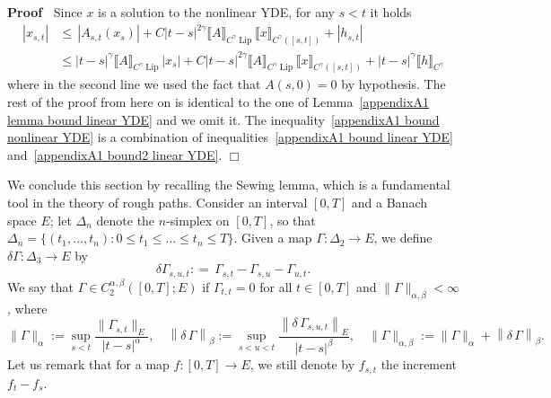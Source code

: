\documentclass[10pt]{article}
\newcommand{\assign}{:=}
\newcommand{\tmop}[1]{\ensuremath{\operatorname{#1}}}
\newenvironment{proof}{\noindent\textbf{Proof\ }}{\hspace*{\fill}$\Box$\medskip}
\begin{document}
\begin{proof}
  Since $x$ is a solution to the nonlinear YDE, for any $s < t$ it holds
%  
  \begin{align*}
    | x_{s, t} | & \leqslant \, | A_{s, t} (x_s) | + C | t - s |^{2 \gamma}
    \llbracket A \rrbracket_{C^{\gamma} \tmop{Lip}} \llbracket x
    \rrbracket_{C^{\gamma} ([s, t])} + | h_{s, t} |\\
    & \leqslant | t - s |^{\gamma} \llbracket A \rrbracket_{C^{\gamma}
    \tmop{Lip}} | x_s | + C | t - s |^{2 \gamma} \llbracket A
    \rrbracket_{C^{\gamma} \tmop{Lip}} \llbracket x \rrbracket_{C^{\gamma}
    ([s, t])} + | t - s |^{\gamma} \llbracket h \rrbracket_{C^{\gamma}}
  \end{align*}
%  
  where in the second line we used the fact that $A (s, 0) = 0$ by hypothesis.
  The rest of the proof from here on is identical to the one of
  Lemma~\ref{appendixA1 lemma bound linear YDE} and we omit it. The
  inequality~{\eqref{appendixA1 bound nonlinear YDE}} is a combination of
  inequalities~{\eqref{appendixA1 bound linear YDE}} and~{\eqref{appendixA1
  bound2 linear YDE}}.
\end{proof}

We conclude this section by recalling the Sewing lemma, which is a fundamental
tool in the theory of rough paths. Consider an interval $[0, T]$ and a Banach
space $E$; let $\Delta_n$ denote the $n$\mbox{-}simplex on $[0, T]$, so that
$\Delta_n = \{ (t_1, \ldots, t_n) : 0 \leqslant t_1 \leqslant \ldots \leqslant
t_n \leqslant T \}$. Given a map $\Gamma : \Delta_2 \rightarrow E$, we define
$\delta \Gamma : \Delta_3 \rightarrow E$ by
\[ \delta \Gamma_{s, u, t} : = \, \Gamma_{s, t} - \Gamma_{s, u} - \Gamma_{u,
   t} . \]
We say that $\Gamma \in C^{\alpha, \beta}_2 ([0, T] ; E)$ if $\Gamma_{t, t} =
0$ for all $t \in [0, T]$ and $\| \Gamma \|_{\alpha, \beta} < \infty$, where
\[ \| \Gamma \|_{\alpha} \assign \sup_{s < t} \frac{\| \Gamma_{s, t} \|_E}{| t
   - s |^{\alpha}}, \quad \left\| \delta \, \Gamma \right\|_{\beta} \assign
   \sup_{s < u < t} \frac{\left\| \delta \, \Gamma_{s, u, t} \right\|_E}{| t -
   s |^{\beta}}, \quad \| \Gamma \|_{\alpha, \beta} \assign \| \Gamma
   \|_{\alpha} + \left\| \delta \, \Gamma \right\|_{\beta} . \]
Let us remark that for a map $f : [0, T] \rightarrow E$, we still denote by
$f_{s, t}$ the increment $f_t - f_s$.
\end{document}
